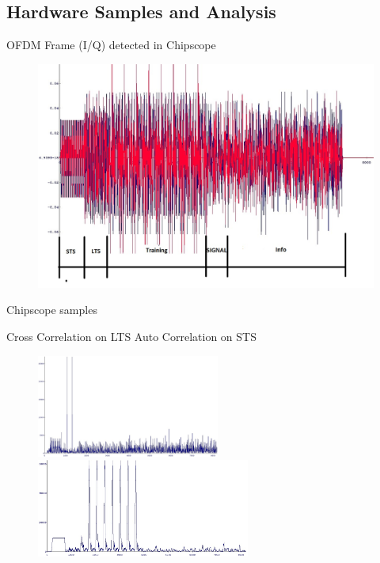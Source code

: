 \documentclass{beamer}
\begin{document}
\subsection{Hardware Samples and Analysis}

\begin{frame}{OFDM Frame (I/Q) detected in Chipscope}
\begin{figure}
\includegraphics[width=\textwidth]{content/fig/ofdmframe_chipscope.JPG}
\end{figure}
\end{frame}

\begin{frame}{Chipscope samples}

Cross Correlation on LTS \hspace{20 mm} Auto Correlation on STS
\begin{figure}
\centering
\includegraphics[width=6cm]{content/fig/crosscorr.JPG}
\includegraphics[width=7cm]{content/fig/autocorr.JPG}
\end{figure}
\end{frame}
\end{document}
